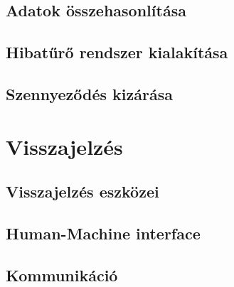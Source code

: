 \subsection{Adatok összehasonlítása}

\subsection{Hibatűrő rendszer kialakítása}

\subsection{Szennyeződés kizárása}

\section{Visszajelzés}

\subsection{Visszajelzés eszközei}

\subsection{Human-Machine interface}

\subsection{Kommunikáció}
